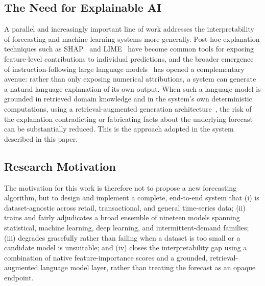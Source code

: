 \subsection{The Need for Explainable AI}
A parallel and increasingly important line of work addresses the interpretability of forecasting and machine learning systems more generally. Post-hoc explanation techniques such as SHAP~\cite{lundberg2017shap} and LIME~\cite{ribeiro2016lime} have become common tools for exposing feature-level contributions to individual predictions, and the broader emergence of instruction-following large language models~\cite{brown2020gpt3,devlin2019bert} has opened a complementary avenue: rather than only exposing numerical attributions, a system can generate a natural-language explanation of its own output. When such a language model is grounded in retrieved domain knowledge and in the system's own deterministic computations, using a retrieval-augmented generation architecture~\cite{lewis2020rag}, the risk of the explanation contradicting or fabricating facts about the underlying forecast can be substantially reduced. This is the approach adopted in the system described in this paper.

\subsection{Research Motivation}
The motivation for this work is therefore not to propose a new forecasting algorithm, but to design and implement a complete, end-to-end system that (i) is dataset-agnostic across retail, transactional, and general time-series data; (ii) trains and fairly adjudicates a broad ensemble of nineteen models spanning statistical, machine learning, deep learning, and intermittent-demand families; (iii) degrades gracefully rather than failing when a dataset is too small or a candidate model is unsuitable; and (iv) closes the interpretability gap using a combination of native feature-importance scores and a grounded, retrieval-augmented language model layer, rather than treating the forecast as an opaque endpoint.

